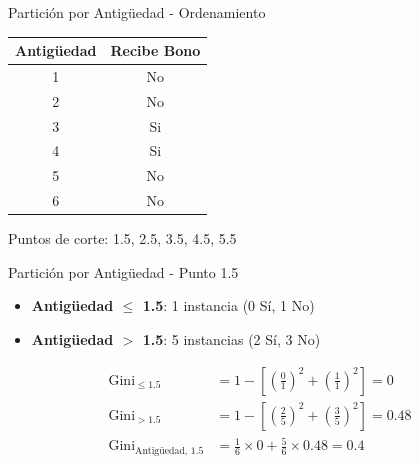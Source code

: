 \documentclass{beamer}
\begin{document}
\begin{frame}{Partición por Antigüedad - Ordenamiento}
    \begin{center}
        \begin{tabular}{cc}
            \toprule
            Antigüedad & Recibe Bono \\
            \midrule
            1 & No \\
            2 & No \\
            3 & Si \\
            4 & Si \\
            5 & No \\
            6 & No \\
            \bottomrule
        \end{tabular}
    \end{center}
    
    \vspace{1em}
    
    \begin{center}
        \Large Puntos de corte: 1.5, 2.5, 3.5, 4.5, 5.5
    \end{center}
\end{frame}

\begin{frame}{Partición por Antigüedad - Punto 1.5}
    \begin{itemize}
        \item \textbf{Antigüedad $\leq$ 1.5}: 1 instancia (0 Sí, 1 No)
        \item \textbf{Antigüedad $>$ 1.5}: 5 instancias (2 Sí, 3 No)
    \end{itemize}
    
    \vspace{0.5em}
    
    \begin{align*}
        \mathrm{Gini}_{\leq 1.5} &= 1 - \left[\left(\tfrac{0}{1}\right)^2 + \left(\tfrac{1}{1}\right)^2\right] = 0 \\
        \mathrm{Gini}_{> 1.5} &= 1 - \left[\left(\tfrac{2}{5}\right)^2 + \left(\tfrac{3}{5}\right)^2\right] = 0.48 \\
        \mathrm{Gini}_{\text{Antigüedad, 1.5}} &= \tfrac{1}{6}\times0 + \tfrac{5}{6}\times0.48 = 0.4
    \end{align*}
\end{frame}
\end{document}
